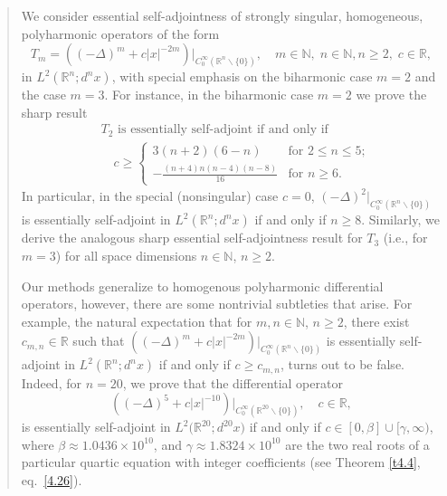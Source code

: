 \documentclass[reqno,11pt,centertags]{amsart}
\newcommand{\bbN}{{\mathbb{N}}}
\newcommand{\bbR}{{\mathbb{R}}}
\newcommand{\<}{\langle}
\renewcommand{\>}{\rangle}
\numberwithin{equation}{section}
\theoremstyle{definition}
\begin{document}
\begin{abstract}
We consider essential self-adjointness of strongly singular, homogeneous, polyharmonic operators of the form 
\[
T_m = \left((-\Delta)^m +c|x|^{-2m}\right)\big|_{C_0^{\infty}(\bbR^n \backslash \{0\})},  \quad m \in \bbN, \; n \in \bbN, n\geq 2, \; c \in \bbR, 
\]
in $L^2(\bbR^n; d^n x)$, with special emphasis on the biharmonic case $m=2$ and the case $m=3$. For instance, in the biharmonic case $m=2$ we prove the sharp result   
\begin{align*} 
& \text{$T_2$ is essentially self-adjoint if and only if}    \\
& \quad 
c\geq \begin{cases}
3(n+2)(6-n) & \mbox{for $2\leq n\leq 5$};\\[5pt]
{\displaystyle -\frac{(n+4)n(n-4)(n-8)}{16}}& \mbox{for $n\geq 6$}.
\end{cases}
\end{align*}
In particular, in the special (nonsingular) case $c=0$, $(-\Delta)^2\big|_{C_0^{\infty}(\bbR^n \backslash \{0\})}$ is essentially self-adjoint in $L^2(\bbR^n; d^n x)$ if and only if $n \geq 8$. 
%
%
Similarly, we derive the analogous sharp essential self-adjointness result for $T_3$ (i.e., for $m=3$) for all space dimensions $n \in \bbN$, $n \geq 2$.   

Our methods generalize to homogenous polyharmonic differential operators, however, there are some nontrivial subtleties that arise. For example, the natural expectation that for $m, n \in \bbN$, $n \geq 2$, there exist $c_{m,n} \in \bbR$ such that 
$\left((-\Delta)^m +c|x|^{-2m}\right)\big|_{C_0^{\infty}(\bbR^n \backslash \{0\})}$ is essentially self-adjoint in $L^2(\bbR^n; d^n x)$ if and only if $c \geq c_{m,n}$, turns out to be false. Indeed, for $n=20$, we prove that the differential operator 
\[
\left((-\Delta)^5 +c|x|^{-10}\right)\big|_{C_0^{\infty}(\bbR^{20} \backslash \{0\})},  \quad c \in \bbR, 
\]
is essentially self-adjoint in $L^2\big( \bbR^{20}; d^{20} x\big)$ if and only if $c\in [0,\beta]\cup [\gamma,\infty)$,
where $\beta  \approx 1.0436\times 10^{10}$, and $\gamma \approx 1.8324 \times 10^{10}$ are the two real roots of a particular quartic equation with integer coefficients (see Theorem \ref{t4.4}, eq.~\eqref{4.26}). 
\end{abstract}
\end{document}
